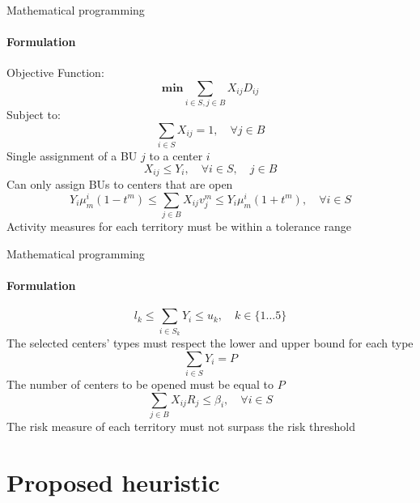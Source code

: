 \documentclass{beamer}
\begin{document}
\begin{frame}{Mathematical programming}
    \framesubtitle{Formulation}
    Objective Function:
    \begin{equation}
        \mathbf{min}\sum_{i \in S, j \in B}{X_{ij} D_{ij}}
    \end{equation}{}
    Subject to:
    \begin{equation}
       \sum_{i \in S} X_{ij} = 1, \quad \forall j \in B
    \end{equation}{}
    \centering \small Single assignment of a BU $j$ to a center $i$
    \begin{equation}
        X_{ij} \le Y_i, \quad \forall i \in S, \quad j \in B
    \end{equation}{}
    Can only assign BUs to centers that are open
    \begin{equation}
        Y_i\mu_m^i(1-t^m) \le \sum_{j\in B}X_{ij}v_j^m \le Y_i\mu_m^i(1+t^m), \quad \forall i \in S
    \end{equation}{}
    Activity measures for each territory must be within a tolerance range
\end{frame}

\begin{frame}{Mathematical programming}
    \framesubtitle{Formulation}
    \begin{equation}
        l_k \le \sum_{i \in S_k} Y_i \le u_k, \quad k \in \{1 \ldots 5\}
    \end{equation}{}
    The selected centers' types must respect the lower and upper bound for each type
    \begin{equation}
        \sum_{i \in S} Y_i = P
    \end{equation}{}
    The number of centers to be opened must be equal to $P$
    \begin{equation}
        \sum_{j \in B}X_{ij}R_j \le \beta_i, \quad \forall i \in S
    \end{equation}{}
    The risk measure of each territory must not surpass the risk threshold
\end{frame}

\section{Proposed heuristic}
\end{document}
